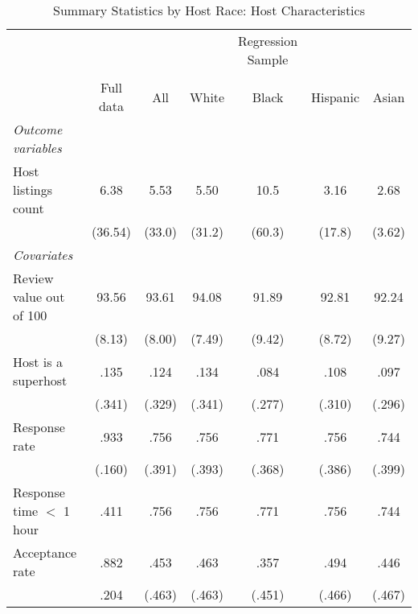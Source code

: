 {
	\begin{longtable}{l*{6}{c}}
		\caption{Summary Statistics by Host Race: Host Characteristics}\\
		
		\hline
		&\multicolumn{1}{c}{}&\multicolumn{1}{c}{}&\multicolumn{1}{c}{}&\multicolumn{1}{c}{Regression Sample}&\multicolumn{1}{c}{}&\multicolumn{1}{c}{}\\
		\cline{3-7}\\
			&\multicolumn{1}{c}{Full data}&\multicolumn{1}{c}{All}&\multicolumn{1}{c}{White}&\multicolumn{1}{c}{Black}&\multicolumn{1}{c}{Hispanic}&\multicolumn{1}{c}{Asian}\\
		\hline\hline           
		     
		\textit{Outcome variables} \\
		
		Host listings count         & 6.38 &      5.53&      5.50 &      10.5&    3.16 & 2.68\\
		& (36.54)	&     (33.0)         &     (31.2)         &     (60.3)         &     (17.8) & 	(3.62)         \\
		
		\textit{Covariates} \\

		\hline
		Review value out of 100      & 93.56  &      93.61	&      94.08	 	&      91.89		&    92.81	 & 		92.24\\
		              &   (8.13)   &     (8.00)         &     (7.49)         &     (9.42)         &     (8.72) 	&	 (9.27)         \\
		
		Host is a superhost    & .135   &      .124		&      .134&      .084 &      .108  	& 	.097\\
		&(.341) & (.329)     &     (.341)         &     (.277)         &     (.310)         &     (.296)         \\

		Response rate      & .933  &       .756		&       .756		&      .771         &      .756  	& 	.744\\
		& (.160) &     (.391)         &     (.393)         &     (.368)         &     (.386)         &		(.399)\\

		Response time $<$ 1 hour      & .411  &       .756		&       .756		&      .771         &      .756  	& 	.744\\

		Acceptance rate      & .882    &      .453&      .463&       .357         &      .494    &	.446     \\
		&.204 &     (.463)         &     (.463)         &     (.451)         &     (.466)         &		(.467)\\


\end{longtable}}
